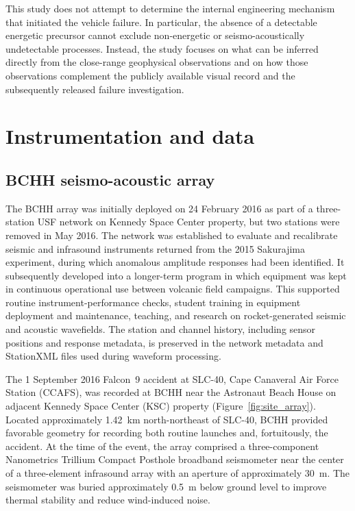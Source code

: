 \documentclass[]{seismica}
\begin{document}
This study does not attempt to determine the internal engineering mechanism
that initiated the vehicle failure. In particular, the absence of a detectable
energetic precursor cannot exclude non-energetic or seismo-acoustically
undetectable processes. Instead, the study focuses on what can be inferred
directly from the close-range geophysical observations and on how those
observations complement the publicly available visual record and the
subsequently released failure investigation.


\section{Instrumentation and data}
\label{sec:data}

\subsection{BCHH seismo-acoustic array}

The BCHH array was initially deployed on 24 February 2016 as part of a
three-station USF network on Kennedy Space Center property, but two stations
were removed in May 2016. The network was established to evaluate and
recalibrate seismic and infrasound instruments returned from the 2015
Sakurajima experiment, during which anomalous amplitude responses had been
identified. It subsequently developed into a longer-term program in which
equipment was kept in continuous operational use between volcanic field
campaigns. This supported routine instrument-performance checks, student
training in equipment deployment and maintenance, teaching, and research on
rocket-generated seismic and acoustic wavefields. The station and channel history, 
including sensor positions and response metadata, is preserved in the network 
metadata and StationXML files used during waveform processing.

The 1 September 2016 Falcon~9 accident at SLC-40, Cape Canaveral Air Force
Station (CCAFS), was recorded at BCHH near the Astronaut Beach House on
adjacent Kennedy Space Center (KSC) property
(Figure~\ref{fig:site_array}). Located approximately 1.42~km
north-northeast of SLC-40, BCHH provided favorable geometry for recording
both routine launches and, fortuitously, the accident. At the time of the
event, the array comprised a three-component Nanometrics Trillium Compact
Posthole broadband seismometer near the center of a three-element infrasound
array with an aperture of approximately 30~m. The seismometer was buried
approximately 0.5~m below ground level to improve thermal stability and reduce
wind-induced noise.
\end{document}
